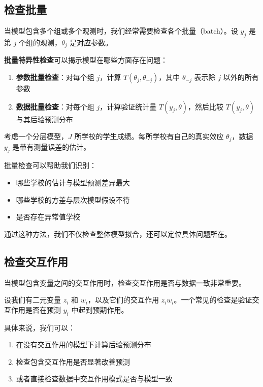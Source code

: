 \subsection{检查批量}

当模型包含多个组或多个观测时，我们经常需要检查各个批量（batch）。设 $y_j$ 是第 $j$ 个组的观测，$\theta_j$ 是对应参数。

\textbf{批量特异性检查}可以揭示模型在哪些方面存在问题：

\begin{enumerate}
  \item \textbf{参数批量检查}：对每个组 $j$，计算 $T(\theta_j, \theta_{-j})$，其中 $\theta_{-j}$ 表示除 $j$ 以外的所有参数
  \item \textbf{数据批量检查}：对每个组 $j$，计算验证统计量 $T(y_j, \theta)$，然后比较 $T(y_j, \theta)$ 与其后验预测分布
\end{enumerate}

\begin{Example}[多组数据的批量检查]
  考虑一个分层模型，$J$ 所学校的学生成绩。每所学校有自己的真实效应 $\theta_j$，数据 $y_j$ 是带有测量误差的估计。

  批量检查可以帮助我们识别：
  \begin{itemize}
    \item 哪些学校的估计与模型预测差异最大
    \item 哪些学校的方差与层次模型假设不符
    \item 是否存在异常值学校
  \end{itemize}

  通过这种方法，我们不仅检查整体模型拟合，还可以定位具体问题所在。
\end{Example}

\subsection{检查交互作用}

当模型包含变量之间的交互作用时，检查交互作用是否与数据一致非常重要。

设我们有二元变量 $z_i$ 和 $w_i$，以及它们的交互作用 $z_i w_i$。一个常见的检查是验证交互作用是否在预测 $y_i$ 中起到预期作用。

具体来说，我们可以：
\begin{enumerate}
  \item 在没有交互作用的模型下计算后验预测分布
  \item 检查包含交互作用是否显著改善预测
  \item 或者直接检查数据中交互作用模式是否与模型一致
\end{enumerate}

